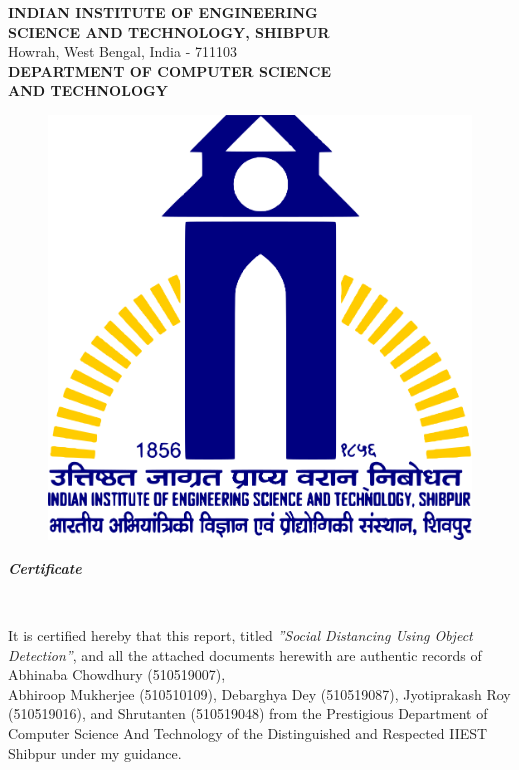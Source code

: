 \documentclass[a4paper]{article}
\begin{document}
\begin{titlepage}

    \begin{center}
        \textup{\large  \textbf{INDIAN INSTITUTE OF ENGINEERING}\\\textbf{SCIENCE AND TECHNOLOGY, SHIBPUR}}\\ Howrah, West Bengal, India - 711103\\[0.5cm]\textbf{\large DEPARTMENT OF COMPUTER SCIENCE}\\\textbf{\large AND TECHNOLOGY}

        \begin{center}
            \begin{figure}[h]   %
                \centering
                \includegraphics[width=0.3\linewidth]{Pictures/IIESTS Logo.png}
            \end{figure}
        \end{center}



        \begin{LARGE}
            \textbf{\textit {Certificate}}
        \end{LARGE}\\[1.2cm]
    \end{center}

    It is certified hereby that this report, titled \textit{”Social Distancing Using Object Detection”}, and all the attached
    documents herewith are authentic records of Abhinaba Chowdhury (510519007),\\Abhiroop Mukherjee (510510109), Debarghya Dey (510519087),
    Jyotiprakash Roy \\(510519016), and Shrutanten (510519048) from the Prestigious Department of \\Computer Science And Technology
    of the Distinguished and Respected IIEST Shibpur under my guidance.


\end{titlepage}
\end{document}
